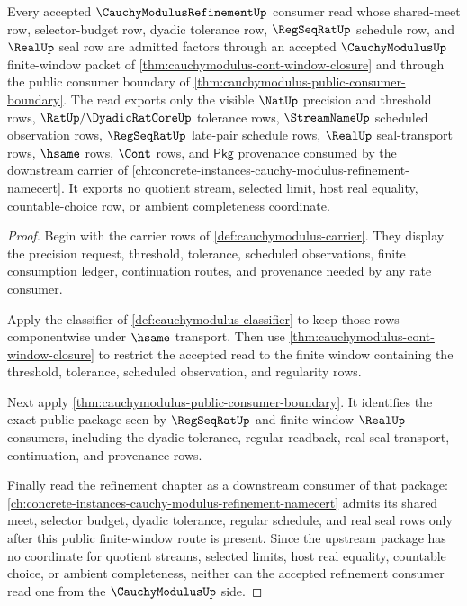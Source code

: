 \begin{theorem}
\label{thm:cauchymodulus-refinement-consumer-boundary}
Every accepted $\CauchyModulusRefinementUp$ consumer read whose shared-meet
row, selector-budget row, dyadic tolerance row, $\RegSeqRatUp$ schedule row,
and $\RealUp$ seal row are admitted factors through an accepted
$\CauchyModulusUp$ finite-window packet of
\autoref{thm:cauchymodulus-cont-window-closure} and through the public
consumer boundary of \autoref{thm:cauchymodulus-public-consumer-boundary}.
The read exports only the visible $\NatUp$ precision and threshold rows,
$\RatUp/\DyadicRatCoreUp$ tolerance rows, $\StreamNameUp$ scheduled
observation rows, $\RegSeqRatUp$ late-pair schedule rows, $\RealUp$
seal-transport rows, $\hsame$ rows, $\Cont$ rows, and $\mathsf{Pkg}$
provenance consumed by the downstream carrier of
\autoref{ch:concrete-instances-cauchy-modulus-refinement-namecert}. It exports
no quotient stream, selected limit, host real equality, countable-choice row,
or ambient completeness coordinate.
\end{theorem}
\begin{proof}
Begin with the carrier rows of \autoref{def:cauchymodulus-carrier}. They
display the precision request, threshold, tolerance, scheduled observations,
finite consumption ledger, continuation routes, and provenance needed by any
rate consumer.

Apply the classifier of \autoref{def:cauchymodulus-classifier} to keep those
rows componentwise under $\hsame$ transport. Then use
\autoref{thm:cauchymodulus-cont-window-closure} to restrict the accepted read
to the finite window containing the threshold, tolerance, scheduled
observation, and regularity rows.

Next apply \autoref{thm:cauchymodulus-public-consumer-boundary}. It identifies
the exact public package seen by $\RegSeqRatUp$ and finite-window $\RealUp$
consumers, including the dyadic tolerance, regular readback, real seal
transport, continuation, and provenance rows.

Finally read the refinement chapter as a downstream consumer of that package:
\autoref{ch:concrete-instances-cauchy-modulus-refinement-namecert} admits its
shared meet, selector budget, dyadic tolerance, regular schedule, and real
seal rows only after this public finite-window route is present. Since the
upstream package has no coordinate for quotient streams, selected limits, host
real equality, countable choice, or ambient completeness, neither can the
accepted refinement consumer read one from the $\CauchyModulusUp$ side.
\end{proof}

